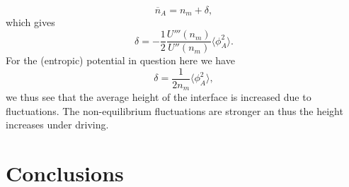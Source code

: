 \begin{equation}
\overline n_A= n_m +\delta,
\end{equation}
which gives
\begin{equation}
\delta = -\frac{1}{2} \frac{U'''(n_m)}{U''(n_m)}\langle\phi_A ^2 \rangle.
\end{equation}
For the (entropic) potential in question here we have
\begin{equation}
\delta = \frac{1}{2n_m} \langle\phi_A ^2 \rangle,
\end{equation}
we thus see that the average height of the interface is increased due to fluctuations. The non-equilibrium fluctuations are stronger an thus the height increases under driving. 


    \section{Conclusions}
           